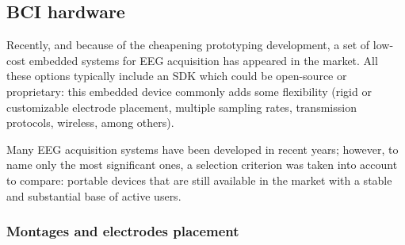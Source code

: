 \subsection{BCI hardware}

Recently, and because of the cheapening prototyping development, a set of low-cost embedded systems for \gls*{EEG} acquisition has appeared in the market. All these options typically include an \gls*{SDK} which could be open-source or proprietary: this embedded device commonly adds some flexibility (rigid or customizable electrode placement, multiple sampling rates, transmission protocols, wireless, among others).

Many \gls*{EEG} acquisition systems have been developed in recent years; however, to name only the most significant ones, a selection criterion was taken into account to compare: portable devices that are still available in the market with a stable and substantial base of active users.



\subsubsection{Montages and electrodes placement}

